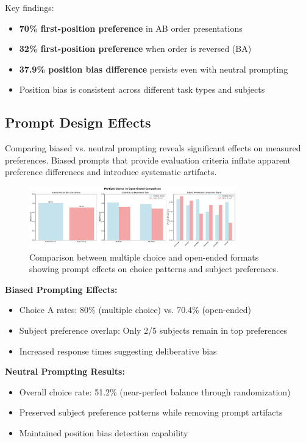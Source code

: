 \documentclass[11pt,a4paper]{article}
\begin{document}
Key findings:
\begin{itemize}
    \item \textbf{70\% first-position preference} in AB order presentations
    \item \textbf{32\% first-position preference} when order is reversed (BA)
    \item \textbf{37.9\% position bias difference} persists even with neutral prompting
    \item Position bias is consistent across different task types and subjects
\end{itemize}

\subsection{Prompt Design Effects}

Comparing biased vs. neutral prompting reveals significant effects on measured preferences. Biased prompts that provide evaluation criteria inflate apparent preference differences and introduce systematic artifacts.

\begin{figure}[h]
    \centering
    \includegraphics[width=0.8\textwidth]{figures/experiment_comparison.pdf}
    \caption{Comparison between multiple choice and open-ended formats showing prompt effects on choice patterns and subject preferences.}
    \label{fig:format_comparison}
\end{figure}

\textbf{Biased Prompting Effects:}
\begin{itemize}
    \item Choice A rates: 80\% (multiple choice) vs. 70.4\% (open-ended)
    \item Subject preference overlap: Only 2/5 subjects remain in top preferences
    \item Increased response times suggesting deliberative bias
\end{itemize}

\textbf{Neutral Prompting Results:}
\begin{itemize}
    \item Overall choice rate: 51.2\% (near-perfect balance through randomization)
    \item Preserved subject preference patterns while removing prompt artifacts
    \item Maintained position bias detection capability
\end{itemize}
\end{document}
